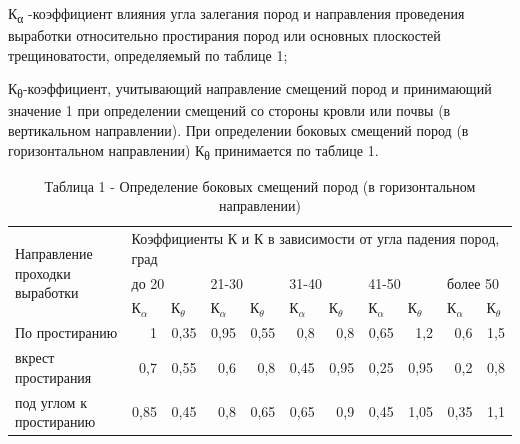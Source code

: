 \begin{multicols}{2}
К\textsubscript{α} -коэффициент влияния угла залегания пород и
на­правления проведения выработки относительно простирания по­род или
основных плоскостей трещиноватости, определяемый по таблице 1;

К\textsubscript{θ}-коэффициент, учитывающий направление сме­щений пород и
принимающий значение 1 при определении сме­щений со стороны кровли или
почвы (в вертикальном направ­лении). При определении боковых смещений
пород (в горизон­тальном направлении) К\textsubscript{θ} принимается по
таблице 1.
\end{multicols}

\begin{table}[H]
\caption*{Таблица 1 - Определение боковых смещений пород (в горизонтальном направлении)}
\centering
\begin{tabular}{|p{}|lrrrrrrrrr|}
\hline
\multirow{3}{=}{Направление проходки выработки} & \multicolumn{10}{l|}{Коэффициенты К и К в зависимости от угла падения пород, град} \\ \cline{2-11}
 & \multicolumn{2}{l|}{до 20} & \multicolumn{2}{l|}{21-30} & \multicolumn{2}{l|}{31-40} & \multicolumn{2}{l|}{41-50} & \multicolumn{2}{l|}{более 50} \\ \cline{2-11}
 & \multicolumn{1}{l|}{К$_{\alpha}$} & \multicolumn{1}{l|}{К$_{\theta}$} & \multicolumn{1}{l|}{К$_{\alpha}$} & \multicolumn{1}{l|}{К$_{\theta}$} & \multicolumn{1}{l|}{К$_{\alpha}$} & \multicolumn{1}{l|}{К$_{\theta}$} & \multicolumn{1}{l|}{К$_{\alpha}$} & \multicolumn{1}{l|}{К$_{\theta}$} & \multicolumn{1}{l|}{К$_{\alpha}$} & \multicolumn{1}{l|}{К$_{\theta}$} \\ \hline
По простиранию & \multicolumn{1}{r|}{1} & \multicolumn{1}{r|}{0,35} & \multicolumn{1}{r|}{0,95} & \multicolumn{1}{r|}{0,55} & \multicolumn{1}{r|}{0,8} & \multicolumn{1}{r|}{0,8} & \multicolumn{1}{r|}{0,65} & \multicolumn{1}{r|}{1,2} & \multicolumn{1}{r|}{0,6} & 1,5 \\ \hline
вкрест простирания & \multicolumn{1}{r|}{0,7} & \multicolumn{1}{r|}{0,55} & \multicolumn{1}{r|}{0,6} & \multicolumn{1}{r|}{0,8} & \multicolumn{1}{r|}{0,45} & \multicolumn{1}{r|}{0,95} & \multicolumn{1}{r|}{0,25} & \multicolumn{1}{r|}{0,95} & \multicolumn{1}{r|}{0,2} & 0,8 \\ \hline
под углом к простиранию & \multicolumn{1}{r|}{0,85} & \multicolumn{1}{r|}{0,45} & \multicolumn{1}{r|}{0,8} & \multicolumn{1}{r|}{0,65} & \multicolumn{1}{r|}{0,65} & \multicolumn{1}{r|}{0,9} & \multicolumn{1}{r|}{0,45} & \multicolumn{1}{r|}{1,05} & \multicolumn{1}{r|}{0,35} & 1,1 \\ \hline
\end{tabular}
\end{table}

